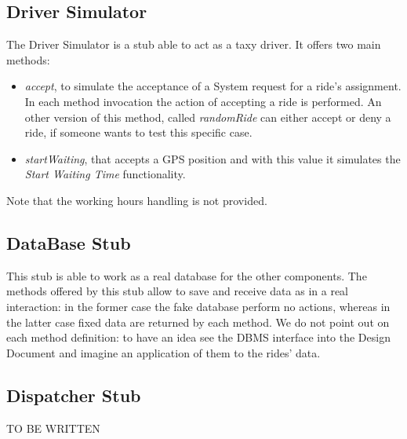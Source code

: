 \documentclass[\mainpath/main]{subfiles}
\begin{document}
\subsection{Driver Simulator}
\label{ProgramStubsAndTestDataRequired:ProgramStubs:DriverSimulator}

The Driver Simulator is a stub able to act as a taxy driver. It offers two main methods:
\begin{itemize}
	\item \textit{accept}, to simulate the acceptance of a System request for a ride's assignment. In each method invocation the action of accepting a ride is performed. An other version of this method, called \textit{randomRide} can either accept or deny a ride, if someone wants to test this specific case.
	\item \textit{startWaiting}, that accepts a GPS position and with this value it simulates the \textit{Start Waiting Time} functionality.
\end{itemize}
Note that the working hours handling is not provided.

\subsection{DataBase Stub}
\label{ProgramStubsAndTestDataRequired:ProgramStubs:DataBaseStub}

This stub is able to work as a real database for the other components. The methods offered by this stub allow to save and receive data as in a real interaction: in the former case the fake database perform no actions, whereas in the latter case fixed data are returned by each method. We do not point out on each method definition: to have an idea see the DBMS interface into the Design Document and imagine an application of them to the rides' data. 

\subsection{Dispatcher Stub}
\label{ProgramStubsAndTestDataRequired:ProgramStubs:DispatcherStub}

TO BE WRITTEN

%
%
%
\end{document}
